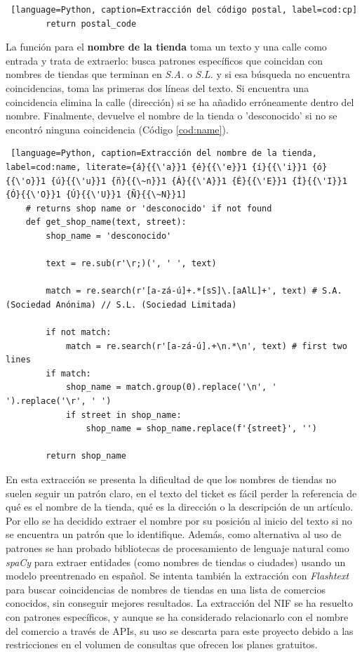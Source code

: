 \begin{itemize}
\begin{lstlisting} [language=Python, caption=Extracción del código postal, label=cod:cp]
        return postal_code
    \end{lstlisting}


\subitem La función para el \textbf{nombre de la tienda} toma un texto y una calle como entrada y trata de extraerlo: busca patrones específicos que coincidan con nombres de tiendas que terminan en \textit{S.A.} o \textit{S.L.} y si esa búsqueda no encuentra coincidencias, toma las primeras dos líneas del texto. Si encuentra una coincidencia elimina la calle (dirección) si se ha añadido erróneamente dentro del nombre. Finalmente, devuelve el nombre de la tienda o 'desconocido' si no se encontró ninguna coincidencia (Código \ref{cod:name}).
    \begin{lstlisting} [language=Python, caption=Extracción del nombre de la tienda, label=cod:name, literate={á}{{\'a}}1 {é}{{\'e}}1 {í}{{\'i}}1 {ó}{{\'o}}1 {ú}{{\'u}}1 {ñ}{{\~n}}1 {Á}{{\'A}}1 {É}{{\'E}}1 {Í}{{\'I}}1 {Ó}{{\'O}}1 {Ú}{{\'U}}1 {Ñ}{{\~N}}1]
    # returns shop name or 'desconocido' if not found
    def get_shop_name(text, street):
        shop_name = 'desconocido'

        text = re.sub(r'\r;)(', ' ', text)

        match = re.search(r'[a-zá-ú]+.*[sS]\.[aAlL]+', text) # S.A. (Sociedad Anónima) // S.L. (Sociedad Limitada)

        if not match:
            match = re.search(r'[a-zá-ú].+\n.*\n', text) # first two lines
        if match:
            shop_name = match.group(0).replace('\n', ' ').replace('\r', ' ')
            if street in shop_name:
                shop_name = shop_name.replace(f'{street}', '')

        return shop_name
    \end{lstlisting}

En esta extracción se presenta la dificultad de que los nombres de tiendas no suelen seguir un patrón claro, en el texto del ticket es fácil perder la referencia de qué es el nombre de la tienda, qué es la dirección o la descripción de un artículo. Por ello se ha decidido extraer el nombre por su posición al inicio del texto si no se encuentra un patrón que lo identifique. Además, como alternativa al uso de patrones se han probado bibliotecas de procesamiento de lenguaje natural como \textit{spaCy} para extraer entidades (como nombres de tiendas o ciudades) usando un modelo preentrenado en español. Se intenta también
la extracción con \textit{Flashtext} para buscar coincidencias de nombres de tiendas en una lista de
comercios conocidos, sin conseguir mejores resultados. La extracción del NIF se ha resuelto con patrones específicos,
y aunque se ha considerado relacionarlo con el nombre del comercio a través de APIs,
su uso se descarta para este proyecto debido a las restricciones en el volumen de
consultas que ofrecen los planes gratuitos.


\end{itemize}

